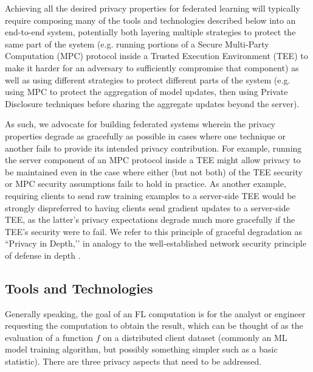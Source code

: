 \documentclass[11pt]{article}
\begin{document}

Achieving all the desired privacy properties for federated learning will typically require composing many of the tools and technologies described below into an end-to-end system, potentially both layering multiple strategies to protect the same part of the system (e.g. running portions of a Secure Multi-Party Computation (MPC) protocol inside a Trusted Execution Environment (TEE) to make it harder for an adversary to sufficiently compromise that component) as well as using different strategies to protect different parts of the system (e.g. using MPC to protect the aggregation of model updates, then using Private Disclosure techniques before sharing the aggregate updates beyond the server).

As such, we advocate for building federated systems wherein the privacy properties degrade as gracefully as possible in cases where one technique or another fails to provide its intended privacy contribution.  For example, running the server component of an MPC protocol inside a TEE might allow privacy to be maintained even in the case where either (but not both) of the TEE security or MPC security assumptions fails to hold in practice.  As another example, requiring clients to send raw training examples to a server-side TEE would be strongly dispreferred to having clients send gradient updates to a server-side TEE, as the latter's privacy expectations degrade much more gracefully if the TEE's security were to fail.  We refer to this principle of graceful degradation as ``Privacy in Depth,’’ in analogy to the well-established network security principle of defense in depth \cite{nsa2012defense}.

\subsection{Tools and Technologies}
\label{ssec:tools_tech}
Generally speaking, the goal of an FL computation is for the analyst or engineer requesting the computation to obtain the result, which can be thought of as the evaluation of a function $f$ on a distributed client dataset (commonly an ML model training algorithm, but possibly something simpler such as a basic statistic). There are three privacy aspects that need to be addressed.
\end{document}
